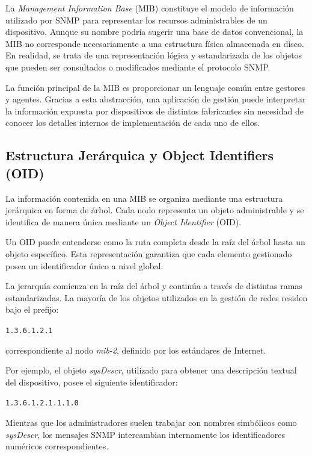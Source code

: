 La \textit{Management Information Base} (MIB) constituye el modelo de información utilizado por SNMP para representar los recursos administrables de un dispositivo. Aunque su nombre podría sugerir una base de datos convencional, la MIB no corresponde necesariamente a una estructura física almacenada en disco. En realidad, se trata de una representación lógica y estandarizada de los objetos que pueden ser consultados o modificados mediante el protocolo SNMP.

La función principal de la MIB es proporcionar un lenguaje común entre gestores y agentes. Gracias a esta abstracción, una aplicación de gestión puede interpretar la información expuesta por dispositivos de distintos fabricantes sin necesidad de conocer los detalles internos de implementación de cada uno de ellos.

\subsection{Estructura Jerárquica y Object Identifiers (OID)}

La información contenida en una MIB se organiza mediante una estructura jerárquica en forma de árbol. Cada nodo representa un objeto administrable y se identifica de manera única mediante un \textit{Object Identifier} (OID).

Un OID puede entenderse como la ruta completa desde la raíz del árbol hasta un objeto específico. Esta representación garantiza que cada elemento gestionado posea un identificador único a nivel global.

La jerarquía comienza en la raíz del árbol y continúa a través de distintas ramas estandarizadas. La mayoría de los objetos utilizados en la gestión de redes residen bajo el prefijo:

\begin{center}
\texttt{1.3.6.1.2.1}
\end{center}

correspondiente al nodo \textit{mib-2}, definido por los estándares de Internet.

Por ejemplo, el objeto \textit{sysDescr}, utilizado para obtener una descripción textual del dispositivo, posee el siguiente identificador:

\begin{center}
\texttt{1.3.6.1.2.1.1.1.0}
\end{center}

Mientras que los administradores suelen trabajar con nombres simbólicos como \textit{sysDescr}, los mensajes SNMP intercambian internamente los identificadores numéricos correspondientes.

